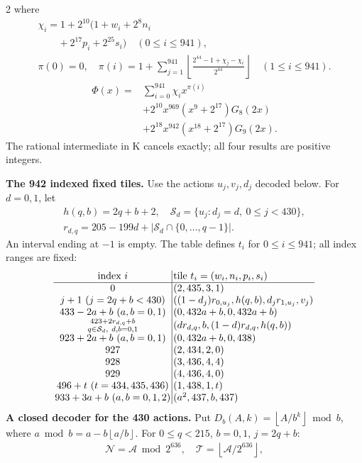 \documentclass[10pt]{article}
\newcommand{\fl}[1]{\left\lfloor#1\right\rfloor}
\newcommand{\rg}[2]{\{#1,\ldots,#2\}}
\begin{document}
\begin{multicols}{2}
where
\[
\begin{gathered}
\chi_i=1+2^{10}(1+w_i+2^8n_i\\
\qquad+2^{17}p_i+2^{25}s_i)\quad(0\le i\le941),\\
\pi(0)=0,\quad\pi(i)=1+\sum_{j=1}^{941}
\fl{\frac{2^{44}-1+\chi_j-\chi_i}{2^{44}}}\quad(1\le i\le941).
\end{gathered}
\]
\[
\begin{split}
\Phi(x)={}&\sum_{i=0}^{941}\chi_i x^{\pi(i)}\\
&+2^{10}x^{969}(x^9+2^{17})G_8(2x)\\
&+2^{18}x^{942}(x^{18}+2^{17})G_9(2x).
\end{split}
\]
The rational intermediate in K cancels exactly; all four results are positive integers.

\textbf{The 942 indexed fixed tiles.}
Use the actions $u_j,v_j,d_j$ decoded below. For $d=0,1$, let
\[
\begin{gathered}
h(q,b)=2q+b+2,\quad
\mathcal S_d=\{u_j:d_j=d,\ 0\le j<430\},\\
r_{d,q}=205-199d+|\mathcal S_d\cap\rg0{q-1}|.
\end{gathered}
\]
An interval ending at $-1$ is empty. The table defines $t_i$ for
$0\le i\le941$; all index ranges are fixed:
\[
\setlength{\arraycolsep}{1.4pt}\begin{array}{c|l}
\text{index }i&\text{tile }t_i=(w_i,n_i,p_i,s_i)\\\hline
0&(2,435,3,1)\\
j+1\ (j=2q+b<430)&((1-d_j)r_{0,u_j},h(q,b),d_jr_{1,u_j},v_j)\\
433-2a+b\ (a,b=0,1)&(0,432a+b,0,432a+b)\\
\substack{423+2r_{d,q}+b\\q\in\mathcal S_d,\ d,b=0,1}&(dr_{d,q},b,(1-d)r_{d,q},h(q,b))\\
923+2a+b\ (a,b=0,1)&(0,432a+b,0,438)\\
927&(2,434,2,0)\\
928&(3,436,4,4)\\
929&(4,436,4,0)\\
496+t\ (t=434,435,436)&(1,438,1,t)\\
933+3a+b\ (a,b=0,1,2)&(a^2,437,b,437)
\end{array}
\]
\textbf{A closed decoder for the 430 actions.}
Put $D_b(A,k)=\fl{A/b^k}\bmod b$, where
$a\bmod b=a-b\fl{a/b}$. For $0\le q<215$, $b=0,1$, $j=2q+b$:
\[
\begin{gathered}
\mathcal N=\mathcal A\bmod2^{636},\quad
\mathcal T=\fl{\mathcal A/2^{636}},\\

\end{gathered}\]
\end{multicols}
\end{document}

